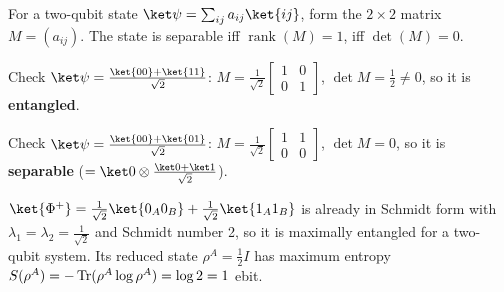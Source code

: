 \documentclass[oneside]{academica}
\begin{document}
\begin{example*}
  For a two-qubit state $\ket\psi=\sum_{ij}a_{ij}\ket{ij}$, form the $2\times2$ matrix $M=(a_{ij})$.
  The state is separable iff $\operatorname{rank}(M)=1$, iff $\det(M)=0$.

  Check $\ket\psi=\frac{\ket{00}+\ket{11}}{\sqrt2}$: $M=\frac{1}{\sqrt2}\begin{bmatrix}1&0\\0&1\end{bmatrix}$, $\det M=\frac12\neq0$, so it is \textbf{entangled}.

  Check $\ket\psi=\frac{\ket{00}+\ket{01}}{\sqrt2}$: $M=\frac{1}{\sqrt2}\begin{bmatrix}1&1\\0&0\end{bmatrix}$, $\det M=0$, so it is \textbf{separable} ($=\ket0\otimes\frac{\ket0+\ket1}{\sqrt2}$).
\end{example*}

\begin{example*}
  $\ket{\Phi^+}=\frac{1}{\sqrt{2}}\ket{0_A0_B}+\frac{1}{\sqrt{2}}\ket{1_A1_B}$ is already in Schmidt form with $\lambda_1=\lambda_2=\frac{1}{\sqrt{2}}$ and Schmidt number 2, so it is maximally entangled for a two-qubit system.
  Its reduced state $\rho^A=\frac12 I$ has maximum entropy $S(\rho^A)=-\operatorname{Tr}(\rho^A\log\rho^A)=\log 2=1$ ebit.
\end{example*}
\end{document}
